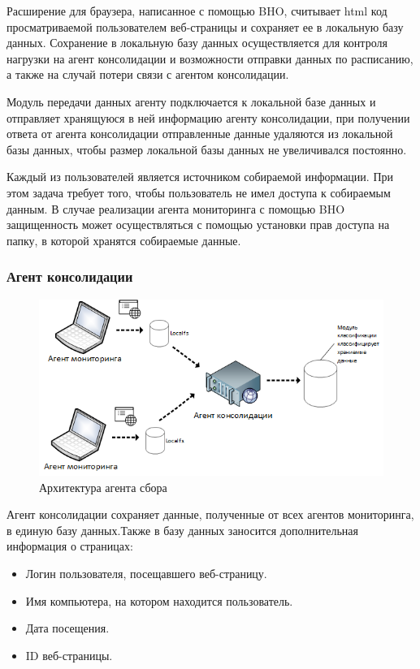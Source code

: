 \documentclass[russian, utf8, emptystyle]{eskdtext}
\begin{document}
Расширение для браузера, написанное с помощью BHO,  считывает html код просматриваемой пользователем веб-страницы и сохраняет ее в локальную базу данных. Сохранение в локальную базу данных осуществляется для контроля нагрузки на агент консолидации и возможности отправки данных по расписанию, а также на случай потери связи с агентом консолидации.

Модуль передачи данных агенту подключается к локальной базе данных и отправляет хранящуюся в ней информацию агенту консолидации, при получении ответа от агента консолидации отправленные данные удаляются из локальной базы данных, чтобы размер локальной базы данных не увеличивался постоянно.

Каждый из пользователей является источником собираемой информации. При этом задача требует того, чтобы пользователь не имел доступа к собираемым данным. В случае реализации агента мониторинга с помощью BHO защищенность может осуществляться с помощью установки прав доступа на папку, в которой хранятся собираемые данные.
\subsubsection {Агент консолидации}
\begin{figure}[h]
	\begin{center}
		\includegraphics[width=14cm]{pic/agent2.png}
		\caption{Архитектура агента сбора}
		\label{fig:low_sigma}
	\end{center}
\end{figure}
Агент консолидации сохраняет данные, полученные от всех агентов мониторинга, в единую базу данных.Также в базу данных заносится дополнительная информация о страницах:
\begin{itemize}
	\item Логин пользователя, посещавшего веб-страницу.
	\item Имя компьютера, на котором находится пользователь.
	\item Дата посещения.
	\item ID веб-страницы.
\end{itemize}
\end{document}
